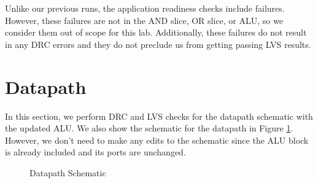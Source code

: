 \documentclass{article}
\begin{document}
	\noindent Unlike our previous runs, the application readiness checks include failures. However, these failures are not in the AND slice, OR slice, or ALU, so we consider them out of scope for this lab. Additionally, these failures do not result in any DRC errors and they do not preclude us from getting passing LVS results.
	
	\section{Datapath}
	
	In this section, we perform DRC and LVS checks for the datapath schematic with the updated ALU. We also show the schematic for the datapath in Figure \ref{fig::datapath_schematic}. However, we don't need to make any edits to the schematic since the ALU block is already included and its ports are unchanged.
	
	\begin{figure}[H]
		\centerline{}
		\caption{Datapath Schematic}
		\label{fig::datapath_schematic}
	\end{figure}
\end{document}
